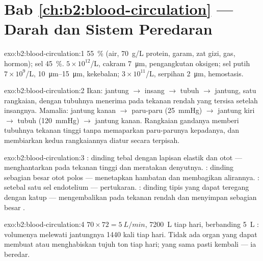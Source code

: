 \section*{Bab \ref{ch:b2:blood-circulation} --- Darah dan Sistem Peredaran}

\begin{solution}{exo:b2:blood-circulation:1}
 \qty{55}{\%} (air, \qty{70}{g/L} protein, garam, zat gizi, gas,
hormon); sel \qty{45}{\%}.  $5\times
10^{12}$/L, cakram \qty{7}{\micro m}, pengangkutan oksigen; sel 
putih $7\times 10^{9}$/L, \qtyrange{10}{15}{\micro m}, kekebalan;
 $3\times 10^{11}$/L, serpihan \qty{2}{\micro m}, hemostasis.
\end{solution}

\begin{solution}{exo:b2:blood-circulation:2}
Ikan: jantung $\to$ insang $\to$ tubuh $\to$ jantung, satu rangkaian,
dengan tubuhnya menerima  pada tekanan rendah yang tersisa setelah
insangnya. Mamalia: jantung kanan $\to$ paru-paru (\qty{25}{mmHg}) $\to$ jantung kiri $\to$ tubuh
(\qty{120}{mmHg}) $\to$ jantung kanan. Rangkaian gandanya memberi
tubuhnya tekanan tinggi tanpa memaparkan paru-parunya kepadanya, dan
membiarkan kedua rangkaiannya diatur secara terpisah.
\end{solution}

\begin{solution}{exo:b2:blood-circulation:3}
: dinding tebal dengan lapisan elastik dan otot --- menghantarkan
 pada tekanan tinggi dan meratakan denyutnya. : dinding
sebagian besar otot polos --- menetapkan hambatan dan membagikan
alirannya. : setebal satu sel endotelium --- pertukaran. :
dinding tipis yang dapat teregang dengan katup --- mengembalikan 
pada tekanan rendah dan menyimpan sebagian besar .
\end{solution}

\begin{solution}{exo:b2:blood-circulation:4}
$70\times 72 = \qty{5}{L/min}$, \qty{7200}{L} tiap hari, berbanding
\qty{5}{L} : volumenya melewati jantungnya \num{1440} kali tiap
hari. Tidak ada organ yang dapat membuat atau menghabiskan tujuh ton
 tiap hari;  yang sama pasti kembali --- ia beredar.
\end{solution}

